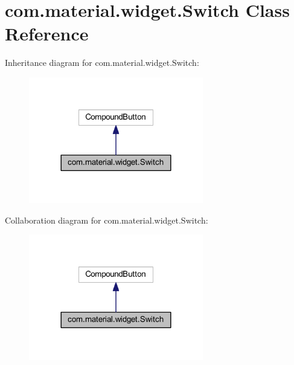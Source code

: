 \hypertarget{classcom_1_1material_1_1widget_1_1_switch}{}\section{com.\+material.\+widget.\+Switch Class Reference}
\label{classcom_1_1material_1_1widget_1_1_switch}


Inheritance diagram for com.\+material.\+widget.\+Switch\+:
\nopagebreak
\begin{figure}[H]
\begin{center}
\leavevmode
\includegraphics[width=216pt]{classcom_1_1material_1_1widget_1_1_switch__inherit__graph}
\end{center}
\end{figure}


Collaboration diagram for com.\+material.\+widget.\+Switch\+:
\nopagebreak
\begin{figure}[H]
\begin{center}
\leavevmode
\includegraphics[width=216pt]{classcom_1_1material_1_1widget_1_1_switch__coll__graph}
\end{center}
\end{figure}
